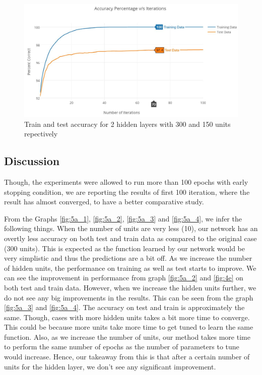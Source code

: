 \documentclass{article}
\begin{document}
\begin{figure}[h!]
  \centering
  \includegraphics[width=117mm]{graphs/Q5b_300Plus150HU_point9Mom_point1LR_128BS_100iter.JPG}
  \caption{Train and test accuracy for 2 hidden layers with 300 and 150 units repectively}
  \label{fig:5b_2}
\end{figure}

\subsection{Discussion}

Though, the experiments were allowed to run more than 100 epochs with early stopping condition, we are reporting the results of first 100 iteration, where the result has almost converged, to have a better comparative study.

From the Graphs \ref{fig:5a_1}, \ref{fig:5a_2}, \ref{fig:5a_3} and \ref{fig:5a_4}, we infer the following things. When the number of units are very less (10), our network has an overtly less accuracy on both test and train data as compared to the original case (300 units). This is expected as the function learned by our network would be very simplistic and thus the predictions are a bit off. As we increase the number of hidden units, the performance on training as well as test starts to improve. We can see the improvement in performance from graph \ref{fig:5a_2} and \ref{fig:4e} on both test and train data. However, when we increase the hidden units further, we do not see any big improvements in the results. This can be seen from the graph \ref{fig:5a_3} and \ref{fig:5a_4}. The accuracy on test and train is approximately the same. Though, cases with more hidden units takes a bit more time to converge. This could be because more units take more time to get tuned to learn the same function. Also, as we increase the number of units, our method takes more time to perform the same number of epochs as the number of parameters to tune would increase. Hence, our takeaway from this is that after a certain number of units for the hidden layer, we don't see any significant improvement.
\end{document}
